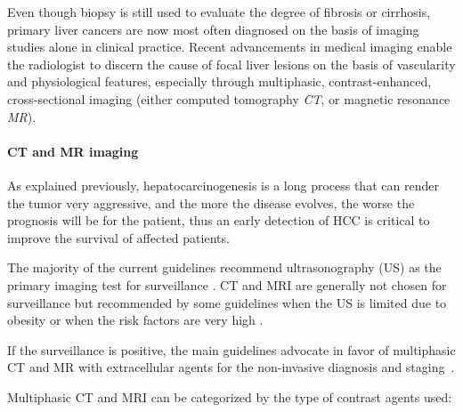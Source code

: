\documentclass[]{article}
\let\oldparagraph\paragraph
\renewcommand{\paragraph}[1]{\oldparagraph{#1}\mbox{}}
\begin{document}
Even though biopsy is still used to evaluate the degree of fibrosis or
cirrhosis, primary liver cancers are now most often diagnosed on the
basis of imaging studies alone in clinical practice. Recent advancements
in medical imaging enable the radiologist to discern the cause of focal
liver lesions on the basis of vascularity and physiological features,
especially through multiphasic, contrast-enhanced, cross-sectional
imaging (either computed tomography \emph{CT}, or magnetic resonance
\emph{MR}).

\paragraph{CT and MR imaging}\label{ct-and-mr-imaging}

As explained previously, hepatocarcinogenesis is a long process that can
render the tumor very aggressive, and the more the disease evolves, the
worse the prognosis will be for the patient, thus an early detection of
HCC is critical to improve the survival of affected patients.

The majority of the current guidelines recommend ultrasonography (US) as
the primary imaging test for surveillance \cite{Choi2014}. CT and MRI are generally not chosen for surveillance but
recommended by some guidelines when the US is limited due to obesity or
when the risk factors are very high \cite{Omata2010, Llovet2012}.

If the surveillance is positive, the main guidelines advocate in favor
of multiphasic CT and MR with extracellular agents for the non-invasive
diagnosis and staging \cite{Kudo2010, Llovet2012, Omata2010, Bruix2011}.

Multiphasic CT and MRI can be categorized by the type of contrast agents
used:
\end{document}
